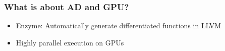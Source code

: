 \documentclass[xcolor=x11names,compress]{beamer}
\begin{document}
\begin{frame}
    \frametitle{What is about AD and GPU?}

    \begin{itemize}
        \item<2-> Enzyme: Automatically generate differentiated functions in LLVM
        \item<3-> Highly parallel execution on GPUs
    \end{itemize}
\end{frame}

%
%
%	
%
%	
%
\end{document}
